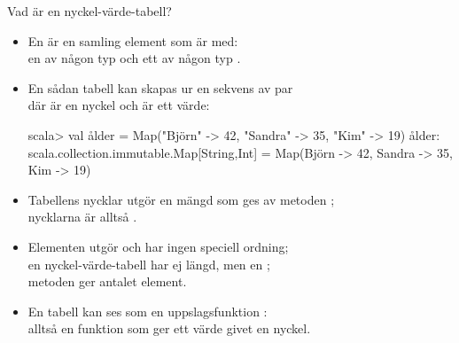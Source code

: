 \begin{Slide}{Vad är en nyckel-värde-tabell?}\SlideFontSmall
\begin{itemize}
\item En  är en samling element som är  med:\\
en  av någon typ  och ett  av någon typ .
\item En sådan tabell kan skapas ur en sekvens av par \\
där  är en nyckel och  är ett värde:
\begin{REPL}
scala> val ålder = Map("Björn" -> 42, "Sandra" -> 35, "Kim" -> 19)
ålder: scala.collection.immutable.Map[String,Int] =
  Map(Björn -> 42, Sandra -> 35, Kim -> 19)
\end{REPL}
\item Tabellens nycklar utgör en mängd som ges av metoden ;\\
nycklarna är alltså .
\item Elementen utgör  och har ingen speciell ordning;
\\en nyckel-värde-tabell har ej längd, men en ;\\metoden {} ger antalet element.
\pause
\item En tabell kan ses som en uppslagsfunktion :\\alltså en funktion  som ger ett värde givet en nyckel.
\end{itemize}
\end{Slide}

%
%
%
%




